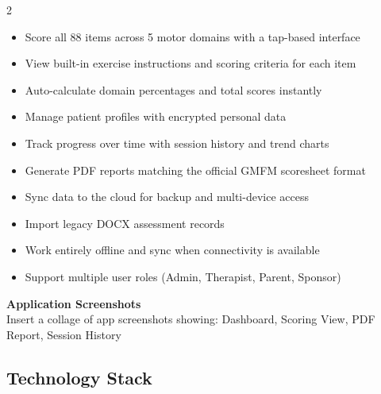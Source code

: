 \documentclass[11pt,a4paper]{article}
\begin{document}
\begin{multicols}{2}
\begin{itemize}[leftmargin=1.5em, itemsep=3pt]
    \item Score all 88 items across 5 motor domains with a tap-based interface
    \item View built-in exercise instructions and scoring criteria for each item
    \item Auto-calculate domain percentages and total scores instantly
    \item Manage patient profiles with encrypted personal data
    \item Track progress over time with session history and trend charts
    \item Generate PDF reports matching the official GMFM scoresheet format
    \item Sync data to the cloud for backup and multi-device access
    \item Import legacy DOCX assessment records
    \item Work entirely offline and sync when connectivity is available
    \item Support multiple user roles (Admin, Therapist, Parent, Sponsor)
\end{itemize}
\end{multicols}

\vspace{0.3cm}
\begin{center}
    \begin{photoplaceholder}[height=7cm, width=0.9\textwidth]
        \vspace{2.5cm}
        {\large\bfseries Application Screenshots}\\[0.3cm]
        {\small Insert a collage of app screenshots showing: Dashboard, Scoring View, PDF Report, Session History}
    \end{photoplaceholder}
\end{center}

\subsection{Technology Stack}
\end{document}
